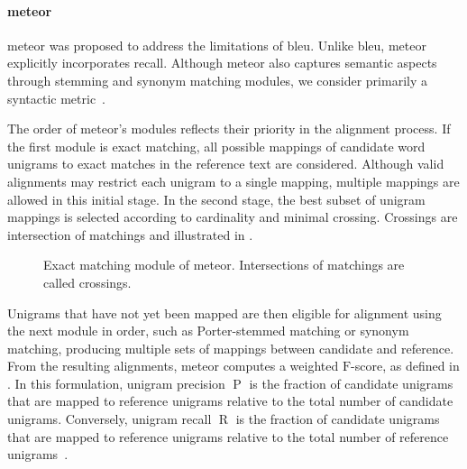 
\paragraph{\acs{meteor}}
\ac{meteor} was proposed to address the limitations of \ac{bleu}. 
Unlike \ac{bleu}, \ac{meteor} explicitly incorporates recall. 
Although \ac{meteor} also captures semantic aspects through stemming and synonym matching modules, we consider  primarily a syntactic metric~\citep{kurt_pehlivanoglu_comparative_2024}. 

The order of \ac{meteor}'s modules reflects their priority in the alignment process. 
If the first module is exact matching, all possible mappings of candidate word unigrams to exact matches in the reference text are considered. 
Although valid alignments may restrict each unigram to a single mapping, multiple mappings are allowed in this initial stage. 
In the second stage, the best subset of unigram mappings is selected according to cardinality and minimal crossing.
Crossings are intersection of matchings and illustrated in .

\begin{figure}[h]
    \centering
    \caption[Exact matching module]{Exact matching module of \ac{meteor}. Intersections of matchings are called crossings.}
    \label{fig:meteor_crossings}
\end{figure}

Unigrams that have not yet been mapped are then eligible for alignment using the next module in order, such as Porter-stemmed matching or synonym matching, producing multiple sets of mappings between candidate and reference. 
From the resulting alignments, \ac{meteor} computes a weighted $\mathrm{F}$-score, as defined in . 
In this formulation, unigram precision $\operatorname{P}$ is the fraction of candidate unigrams that are mapped to reference unigrams relative to the total number of candidate unigrams. 
Conversely, unigram recall $\operatorname{R}$ is the fraction of candidate unigrams that are mapped to reference unigrams relative to the total number of reference unigrams~\citep{banerjee_METEOR_2005}.

